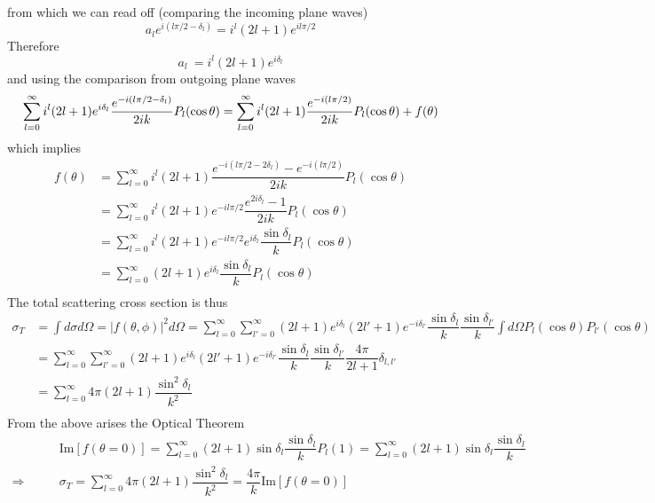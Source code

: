 \documentclass[aps,prb,onecolumn,notitlepage,showpacs,floatfix,superscriptaddress]{revtex4-1}
\begin{document}
from which we can read off (comparing the incoming plane waves)
\begin{equation}
a_l e^{i(l\pi/2-\delta_l)} = i^l (2l+1) e^{i l\pi/2}
\end{equation}
Therefore 
\begin{equation}
a_l \ = i^l (2l+1) e^{i \delta_l}
\end{equation}
and using the comparison from outgoing plane waves
\begin{equation}
\sum_{l=0}^\infty  i^l (2l+1) e^{i \delta_l} \dfrac{e^{-i( l\pi/2 - \delta_l)}}{2ik}   P_l(\cos\theta) =  \sum_{l=0}^\infty i^l (2 l +1) \dfrac{e^{-i( l\pi/2)}}{2ik}   P_l (\cos \theta) + f(\theta)  \\
\end{equation}
which implies
\begin{equation}
\begin{split}
f(\theta) &= \sum_{l=0}^\infty  i^l (2l+1)  \dfrac{e^{-i( l\pi/2 - 2\delta_l)}-e^{-i( l\pi/2)}}{2ik}   P_l(\cos\theta)  \\
&= \sum_{l=0}^\infty  i^l (2l+1) e^{-i l\pi/2}  \dfrac{e^{2i\delta_l}-1}{2ik}   P_l(\cos\theta)  \\
&= \sum_{l=0}^\infty  i^l (2l+1) e^{-i l\pi/2} e^{i\delta_l}  \dfrac{\sin\delta_l}{k}   P_l(\cos\theta)  \\
&= \sum_{l=0}^\infty (2l+1) e^{i\delta_l}  \dfrac{\sin\delta_l}{k}   P_l(\cos\theta)  \\
\end{split}
\end{equation}
The total scattering cross section is thus
\begin{equation}
\begin{split}
\sigma_T &= \int d\sigma d\Omega = \vert f(\theta,\phi)\vert^2 d\Omega = \sum_{l=0}^\infty \sum_{l'=0}^\infty  (2l+1) e^{i\delta_l} (2l'+1) e^{-i\delta_{l'}}  \dfrac{\sin\delta_l}{k} \dfrac{\sin\delta_{l'}}{k}   \int d\Omega P_l(\cos\theta)  P_{l'}(\cos\theta)  \\
&= \sum_{l=0}^\infty \sum_{l'=0}^\infty  (2l+1) e^{i\delta_l} (2l'+1) e^{-i\delta_{l'}}  \dfrac{\sin\delta_l}{k} \dfrac{\sin\delta_{l'}}{k}  \dfrac{4\pi}{2l+1} \delta_{l,l'}  \\
&= \sum_{l=0}^\infty 4\pi (2l+1) \dfrac{\sin^2 \delta_l}{k^2}   \\
\end{split}
\end{equation}
From the above arises the Optical Theorem
\begin{equation}
\begin{split}
&\text{Im}[f(\theta=0)] = \sum_{l=0}^\infty (2l+1) \sin\delta_l  \dfrac{\sin\delta_l}{k}   P_l(1)  = \sum_{l=0}^\infty (2l+1) \sin\delta_l  \dfrac{\sin\delta_l}{k}  \\ 
\Rightarrow  \qquad &\sigma_T =  \sum_{l=0}^\infty 4\pi (2l+1) \dfrac{\sin^2 \delta_l}{k^2}   = \dfrac{4\pi}{k} \text{Im}[f(\theta=0)]
\end{split}
\end{equation}
\end{document}
